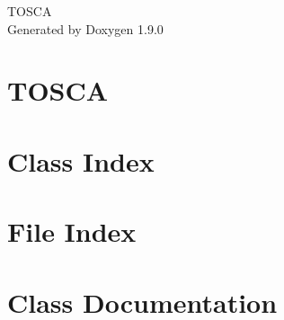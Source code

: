 \let\mypdfximage\pdfximage\def\pdfximage{\immediate\mypdfximage}\documentclass[twoside]{book}
\newcommand{\+}{\discretionary{\mbox{\scriptsize$\hookleftarrow$}}{}{}}
\newcommand{\clearemptydoublepage}{%
  \newpage{\pagestyle{empty}\cleardoublepage}%
}
\begin{document}
\raggedbottom

\hypersetup{pageanchor=false,
             bookmarksnumbered=true,
             pdfencoding=unicode
            }
\begin{titlepage}
\vspace*{7cm}
\begin{center}%
{\Large TOSCA }\\
\vspace*{1cm}
{\large Generated by Doxygen 1.9.0}\\
\end{center}
\end{titlepage}
\clearemptydoublepage
{}
\tableofcontents
\clearemptydoublepage
{}
\hypersetup{pageanchor=true}

\chapter{TOSCA}
\label{index}\hypertarget{index}{}
\chapter{Class Index}

\chapter{File Index}

\chapter{Class Documentation}






















































\end{document}
